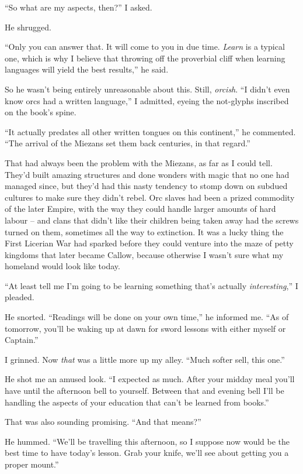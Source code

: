 \documentclass[12pt, openany]{book}
\begin{document}
“So what are my aspects, then?” I asked.

He shrugged.

“Only you can answer that. It will come to you in due time. \textit{Learn} is a typical one, which is why I believe that throwing off the proverbial cliff when learning languages will yield the best results,” he said.

So he wasn’t being entirely unreasonable about this. Still, \textit{orcish}. “I didn’t even know orcs had a written language,” I admitted, eyeing the not-glyphs inscribed on the book’s spine.

“It actually predates all other written tongues on this continent,” he commented. “The arrival of the Miezans set them back centuries, in that regard.”

That had always been the problem with the Miezans, as far as I could tell. They’d built amazing structures and done wonders with magic that no one had managed since, but they’d had this nasty tendency to stomp down on subdued cultures to make sure they didn’t rebel. Orc slaves had been a prized commodity of the later Empire, with the way they could handle larger amounts of hard labour – and clans that didn’t like their children being taken away had the screws turned on them, sometimes all the way to extinction. It was a lucky thing the First Licerian War had sparked before they could venture into the maze of petty kingdoms that later became Callow, because otherwise I wasn’t sure what my homeland would look like today.

“At least tell me I’m going to be learning something that’s actually \textit{interesting},” I pleaded.

He snorted. “Readings will be done on your own time,” he informed me. “As of tomorrow, you’ll be waking up at dawn for sword lessons with either myself or Captain.”

I grinned. Now \textit{that} was a little more up my alley. “Much softer sell, this one.”

He shot me an amused look. “I expected as much. After your midday meal you’ll have until the afternoon bell to yourself. Between that and evening bell I’ll be handling the aspects of your education that can’t be learned from books.”

That was also sounding promising. “And that means?”

He hummed. “We’ll be travelling this afternoon, so I suppose now would be the best time to have today’s lesson. Grab your knife, we’ll see about getting you a proper mount.”
\end{document}
